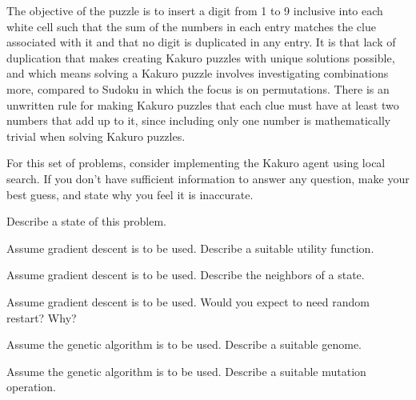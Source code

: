 \documentclass[11pt]{article}
\begin{document}
The objective of the puzzle is to insert a digit from 1 to 9 inclusive into each white cell such that the sum of the numbers in each entry matches the clue associated with it and that no digit is duplicated in any entry. It is that lack of duplication that makes creating Kakuro puzzles with unique solutions possible, and which means solving a Kakuro puzzle involves investigating combinations more, compared to Sudoku in which the focus is on permutations. There is an unwritten rule for making Kakuro puzzles that each clue must have at least two numbers that add up to it, since including only one number is mathematically trivial when solving Kakuro puzzles.

For this set of problems, consider implementing the Kakuro agent using local search.
If you don't have sufficient information to answer any question, make your
best guess, and state why you feel it is inaccurate.

\begin{problem}{2}
  Describe a state of this problem.
  \vspace*{1in}
\end{problem}

\begin{problem}{2}
  Assume gradient descent is to be used.  Describe a suitable utility function.
  \vspace*{1in}
\end{problem}

\begin{problem}{2}
  Assume gradient descent is to be used.  Describe the neighbors of a state.
  \vspace*{1in}
\end{problem}

\begin{problem}{2}
  Assume gradient descent is to be used.  Would you expect to need random restart?  Why?
  \vspace*{1in}
\end{problem}

\begin{problem}{2}
  Assume the genetic algorithm is to be used.  Describe a suitable genome.
  \vspace*{1in}
\end{problem}

\begin{problem}{2}
  Assume the genetic algorithm is to be used.  Describe a suitable mutation operation.
  \vspace*{1in}
\end{problem}
\end{document}
